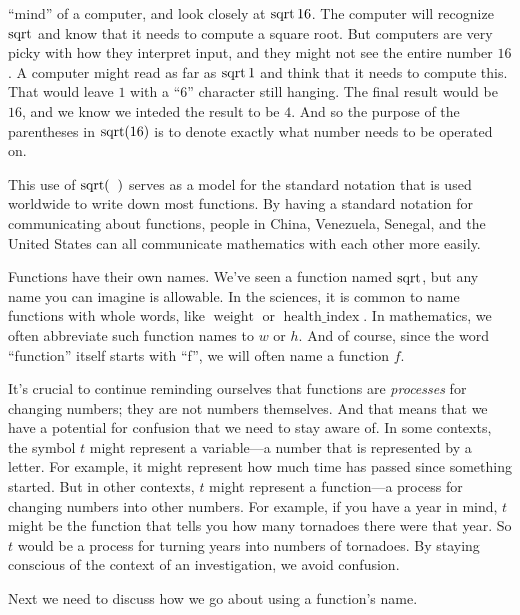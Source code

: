 		``mind'' of a computer, and look closely at $\sq\num{16}$. The computer will recognize $\sq$
		and know that it needs to compute a square root. But computers are very picky with how they interpret input, and 
		they might not see the entire number $\num{16}$. A computer might read as far as $\sq\num{1}$ and think that it needs to compute this.
		That would leave $1$ with a ``6'' character still hanging. The final result would be $\num{16}$, and we know we inteded the  
		result to be $4$. And so the purpose of the parentheses in $\sq[\num{16}]$ is 
		to denote exactly what number needs to be operated on.
%
\par This use of $\sq[(]$ serves as a model for the standard notation that is used worldwide to
        	write down most functions. By having a standard notation for communicating about functions,
        	people in China, Venezuela, Senegal, and the United States can all communicate mathematics
        	with each other more easily.
%
\par Functions have their own names. We've seen a function named $\sq$, but any name you can
        	imagine is allowable. In the sciences, it is common to name functions with whole words,
        	like $\operatorname{weight}$ or $\operatorname{health\_index}$. In mathematics, we often
        	abbreviate such function names to $w$ or $h$. And of course, since the word ``function''
        	itself starts with ``f'', we will often name a function $f$.
%
\par It's crucial to continue reminding ourselves that functions are \emph{processes} for
        	changing numbers; they are not numbers themselves. And that means that we have a potential
        	for confusion that we need to stay aware of. In some contexts, the symbol $t$ might
        	represent a variable---a number that is represented by a letter. For example, it might represent 
		how much time has passed since something started. But in other contexts, $t$
        	might represent a function---a process for changing numbers into other numbers. For example, if you 
		have a year in mind, $t$ might be the function that tells you how many tornadoes there were that year. 
		So $t$ would be a process for turning years into numbers of tornadoes. By
        	staying conscious of the context of an investigation, we avoid confusion.
%
\par Next we need to discuss how we go about using a function's name.
%
